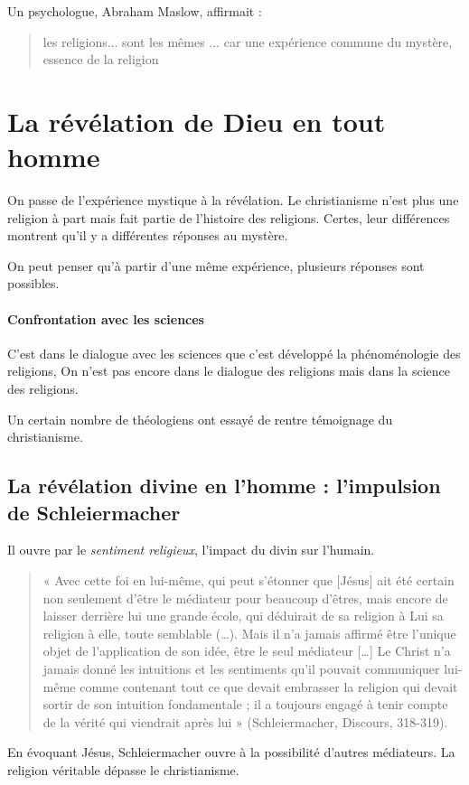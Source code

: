 Un psychologue, Abraham Maslow, affirmait : 
\begin{quote}
    les religions... sont les mêmes ... car une expérience commune du mystère, essence de la religion
\end{quote}


\section{La révélation de Dieu en tout homme}

On passe de l'expérience mystique à la révélation.
Le christianisme n'est plus une religion à part mais fait partie de l'histoire des religions.
Certes, leur différences montrent qu'il y a différentes réponses au mystère. 

On peut penser qu'à partir d'une même expérience, plusieurs réponses sont possibles.

\paragraph{Confrontation avec les sciences} C'est dans le dialogue avec les sciences que c'est développé la phénoménologie des religions, On n'est pas encore dans le dialogue des religions mais dans la science des religions.

Un certain nombre de théologiens ont essayé de rentre témoignage du christianisme.

\subsection{La révélation divine en l’homme : l’impulsion de Schleiermacher} 

Il ouvre  par le \textit{sentiment religieux}, l'impact du divin sur l'humain. 
\begin{quote}
    « Avec cette foi en lui-même, qui peut s’étonner que [Jésus] ait été certain non seulement d’être le médiateur pour beaucoup d’êtres, mais encore de laisser derrière lui une grande école, qui déduirait de sa religion à Lui sa religion à elle, toute semblable (…). Mais il n’a jamais affirmé être l’unique objet de l’application de son idée, être le seul médiateur […] Le Christ n’a jamais donné les intuitions et les sentiments qu’il pouvait communiquer lui-même comme contenant tout ce que devait embrasser la religion qui devait sortir de son intuition fondamentale ; il a toujours engagé à tenir compte de la vérité qui viendrait après lui » (Schleiermacher, Discours, 318-319). 
\end{quote}
En évoquant Jésus, Schleiermacher ouvre à la possibilité d'autres médiateurs. La religion véritable dépasse le christianisme. 


